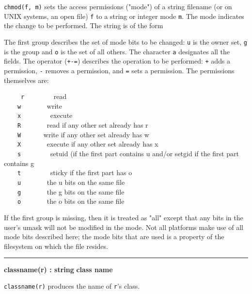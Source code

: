\noindent
{}
\texttt{chmod(f, m)}
sets the access permissions ("mode") of
a string filename (or on UNIX systems, an open file) \texttt{f} to a
string or integer mode \texttt{m}. The mode indicates the change to be
performed. The string is of the form

\iconcode{
\>   [ugoa]*[+-=][rwxRWXstugo]* }%

The first group describes the set of mode bits to be changed: \texttt{u}
is the owner set, \texttt{g} is the group and \texttt{o} is the set of
all others. The character \texttt{a} designates all the fields. The
operator (\texttt{+-=}) describes the operation to be performed:
\texttt{+} adds a permission, \texttt{{}-} removes a permission, and
\texttt{=} sets a permission. The permissions themselves are: 

\ \ \ \ \ \texttt{r} \ \ \ \ \ \ \ \ read\\
 \ \ \ \ \texttt{w} \ \ \ \ \ \ \ write\\
 \ \ \ \ \texttt{x} \ \ \ \ \ \ \ \ execute\\
 \ \ \ \ \texttt{R} \ \ \ \ \ \ \ read if any other set already has
r\\
 \ \ \ \ \texttt{W} \ \ \ \ \ \ write if any other set already has
w\\
 \ \ \ \ \texttt{X} \ \ \ \ \ \ \ execute if any other set already has
x\\
 \ \ \ \ \texttt{s} \ \ \ \ \ \ \ \ setuid (if the first part contains u
and/or setgid if the first part contains g\\
 \ \ \ \ \texttt{t} \ \ \ \ \ \ \ \ sticky if the first part has
o\\
 \ \ \ \ \texttt{u} \ \ \ \ \ \ \ the u bits on the same file\\
 \ \ \ \ \texttt{g} \ \ \ \ \ \ \ the g bits on the same file\\
 \ \ \ \ \texttt{o} \ \ \ \ \ \ \ the o bits on the same file

If the first group is missing, then it is treated as
"all" except that any bits in the
user's umask will not be modified in the mode. Not all
platforms make use of all mode bits described here; the mode bits that
are used is a property of the filesystem on which the file resides.

\bigskip
\hrule\vspace{0.1cm}
\noindent
{\bf classname(r) : string } \hfill {\bf class name}

\noindent
\texttt{classname(r)} produces the name of \texttt{r}'s
class.

